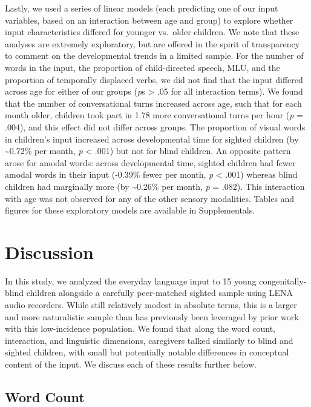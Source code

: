 \documentclass[
  man,floatsintext]{apa6}
\begin{document}
Lastly, we used a series of linear models (each predicting one of our input variables, based on an interaction between age and group) to explore whether input characteristics differed for younger vs.~older children. We note that these analyses are extremely exploratory, but are offered in the spirit of transparency to comment on the developmental trends in a limited sample. For the number of words in the input, the proportion of child-directed speech, MLU, and the proportion of temporally displaced verbs, we did not find that the input differed across age for either of our groups (\emph{p}s \textgreater{} .05 for all interaction terms). We found that the number of conversational turns increased across age, such that for each month older, children took part in 1.78 more conversational turns per hour (\emph{p} = .004), and this effect did not differ across groups. The proportion of visual words in children's input increased across developmental time for sighted children (by \textasciitilde0.72\% per month, \emph{p} \textless{} .001) but not for blind children. An opposite pattern arose for amodal words: across developmental time, sighted children had fewer amodal words in their input (-0.39\% fewer per month, \emph{p} \textless{} .001) whereas blind children had marginally more (by \textasciitilde0.26\% per month, \emph{p} = .082). This interaction with age was not observed for any of the other sensory modalities. Tables and figures for these exploratory models are available in Supplementals.

\hypertarget{discussion}{%
\section{Discussion}\label{discussion}}

In this study, we analyzed the everyday language input to 15 young congenitally-blind children alongside a carefully peer-matched sighted sample using LENA audio recorders. While still relatively modest in absolute terms, this is a larger and more naturalistic sample than has previously been leveraged by prior work with this low-incidence population. We found that along the word count, interaction, and linguistic dimensions, caregivers talked similarly to blind and sighted children, with small but potentially notable differences in conceptual content of the input. We discuss each of these results further below.

\hypertarget{word-count}{%
\subsection{Word Count}\label{word-count}}
\end{document}
